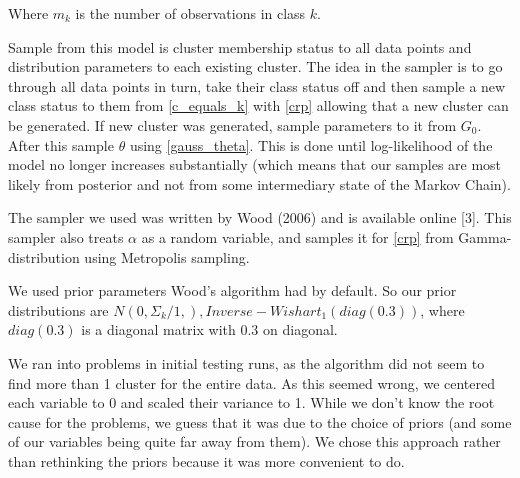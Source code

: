 \documentclass[a4paper]{article}
\begin{document}
Where $m_k$ is the number of observations in class $k$.

  \par
  Sample from this model is cluster membership status to all data points and distribution parameters to each existing cluster. The idea in the sampler is to go through all data points in turn, take their class status off and then sample a new class status to them from \ref{c_equals_k} with \ref{crp} allowing that a new cluster can be generated. If new cluster was generated, sample parameters to it from $G_0$. After this sample $\theta$ using \ref{gauss_theta}. This is done until log-likelihood of the model no longer increases substantially (which means that our samples are most likely from posterior and not from some intermediary state of the Markov Chain).
  
  The sampler we used was written by Wood (2006) and is available online [3]. This sampler also treats $\alpha$ as a random variable, and samples it for \ref{crp} from Gamma-distribution using Metropolis sampling.
  
  We used prior parameters Wood's algorithm had by default. So our prior distributions are $N(0, \Sigma_k / 1,), Inverse-Wishart_{1}(diag(0.3))$, where $diag(0.3)$ is a diagonal matrix with $0.3$ on diagonal. 
  
  We ran into problems in initial testing runs, as the algorithm did not seem to find more than 1 cluster for the entire data. As this seemed wrong, we centered each variable to 0 and scaled their variance to 1. While we don't know the root cause for the problems, we guess that it was due to the choice of priors (and some of our variables being quite far away from them). We chose this approach rather than rethinking the priors because it was more convenient to do.





\end{document}
